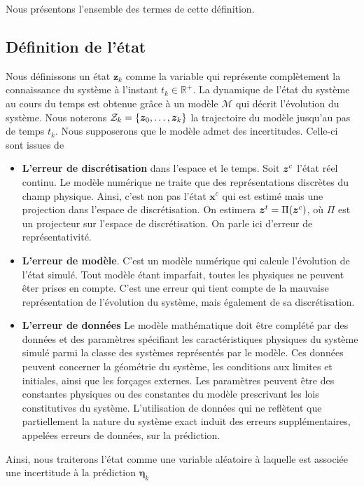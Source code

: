 Nous présentons l'ensemble des termes de cette définition.

\subsection{Définition de l'état}

Nous définissons un état $\bm z_k$ comme la variable qui représente complètement la connaissance du système à l'instant $t_k \in \mathbb R^+$. La dynamique de l'état du système au cours du temps est obtenue grâce à un modèle $\mathcal{M}$ qui décrit l'évolution du système.
Nous noterons $\mathcal Z_k = \{\bm z_0, \dots, \bm z_k\}$ la trajectoire du modèle jusqu'au pas de temps $t_k$.
Nous supposerons que le modèle admet des incertitudes. Celle-ci sont issues de

\begin{itemize}
    \item \textbf{L'erreur de discrétisation} dans l'espace et le temps. Soit $\bm z^c$ l'état réel continu. Le modèle numérique ne traite que des représentations discrètes du champ physique. Ainsi, c'est non pas l'état $\bm x^c$ qui est estimé mais une projection dans l'espace de discrétisation. On estimera $\bm z^t = \Pi(\bm z^c)$, où $\Pi$ est un projecteur sur l'espace de discrétisation. On parle ici d'erreur de représentativité.
    \item \textbf{L'erreur de modèle}. C'est un modèle numérique qui calcule l'évolution de l'état simulé. Tout modèle étant imparfait, toutes les physiques ne peuvent êter prises en compte. C'est une erreur qui tient compte de la mauvaise représentation de l'évolution du système, mais également de sa discrétisation.
    \item \textbf{L'erreur de données} Le modèle mathématique doit être complété par des données et des paramètres spécifiant les caractéristiques physiques du système simulé parmi la classe des systèmes représentés par le modèle. Ces données peuvent concerner la géométrie du système, les conditions aux limites et initiales, ainsi que les forçages externes. Les paramètres peuvent être des constantes physiques ou des constantes du modèle prescrivant les lois constitutives du système. L'utilisation de données qui ne reflètent que partiellement la nature du système exact induit des erreurs supplémentaires, appelées erreurs de données, sur la prédiction.
\end{itemize}

Ainsi, nous traiterons l'état comme une variable aléatoire à laquelle est associée une incertitude à la prédiction $\bm \eta_k$


